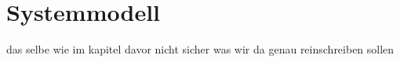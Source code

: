 \chapter{Systemmodell}

das selbe wie im kapitel davor nicht sicher was wir da genau reinschreiben
sollen
